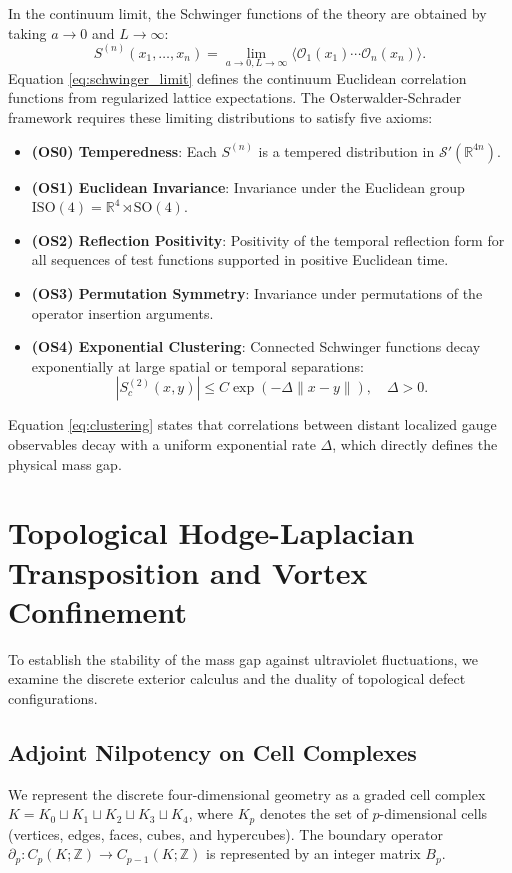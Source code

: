 \documentclass[11pt,reqno]{amsart}
\theoremstyle{plain}
\theoremstyle{definition}
\theoremstyle{remark}
\numberwithin{equation}{section}
\begin{document}
In the continuum limit, the Schwinger functions of the theory are obtained by taking $a \to 0$ and $L \to \infty$:
\begin{equation}
\label{eq:schwinger_limit}
S^{(n)}(x_1, \ldots, x_n) = \lim_{a \to 0, L \to \infty} \langle \mathcal{O}_1(x_1) \cdots \mathcal{O}_n(x_n) \rangle.
\end{equation}
Equation \eqref{eq:schwinger_limit} defines the continuum Euclidean correlation functions from regularized lattice expectations. The Osterwalder-Schrader framework requires these limiting distributions to satisfy five axioms:
\begin{itemize}
\item \textbf{(OS0) Temperedness}: Each $S^{(n)}$ is a tempered distribution in $\mathcal{S}'(\mathbb{R}^{4n})$.
\item \textbf{(OS1) Euclidean Invariance}: Invariance under the Euclidean group $\mathrm{ISO}(4) = \mathbb{R}^4 \rtimes \mathrm{SO}(4)$.
\item \textbf{(OS2) Reflection Positivity}: Positivity of the temporal reflection form for all sequences of test functions supported in positive Euclidean time.
\item \textbf{(OS3) Permutation Symmetry}: Invariance under permutations of the operator insertion arguments.
\item \textbf{(OS4) Exponential Clustering}: Connected Schwinger functions decay exponentially at large spatial or temporal separations:
\begin{equation}
\label{eq:clustering}
|S^{(2)}_c(x, y)| \le C \exp(-\Delta \|x - y\|), \quad \Delta > 0.
\end{equation}
\end{itemize}
Equation \eqref{eq:clustering} states that correlations between distant localized gauge observables decay with a uniform exponential rate $\Delta$, which directly defines the physical mass gap.

\section{Topological Hodge-Laplacian Transposition and Vortex Confinement}

To establish the stability of the mass gap against ultraviolet fluctuations, we examine the discrete exterior calculus and the duality of topological defect configurations.

\subsection{Adjoint Nilpotency on Cell Complexes}
We represent the discrete four-dimensional geometry as a graded cell complex $K = K_0 \sqcup K_1 \sqcup K_2 \sqcup K_3 \sqcup K_4$, where $K_p$ denotes the set of $p$-dimensional cells (vertices, edges, faces, cubes, and hypercubes). The boundary operator $\partial_p : C_p(K; \mathbb{Z}) \to C_{p-1}(K; \mathbb{Z})$ is represented by an integer matrix $B_p$.
\end{document}
